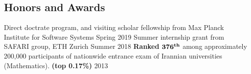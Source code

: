 \documentclass[../main.tex]{subfiles}
\begin{document}
\begin{category}
\section{Honors and Awards}
	\citembullet  Direct doctrate program, and visiting scholar fellowship from Max Planck Institute for Software Systems \hfill Spring 2019
	\citembullet  Summer internship grant from SAFARI group, ETH Zurich \hfill Summer 2018
    \citembullet \textbf{Ranked $\bf376^{th}$} among approximately 200,000 participants of
    nationwide entrance exam of Irannian universities (Mathematics). \textbf{(top 0.17\%)} \hfill 2013
\end{category}
\end{document}
